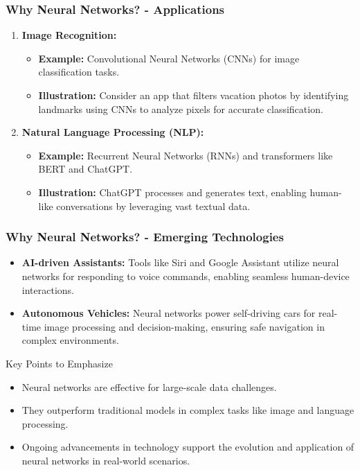 \documentclass[aspectratio=169]{beamer}
\begin{document}
\begin{frame}[fragile]
    \frametitle{Why Neural Networks? - Applications}
    \begin{enumerate}
        \item \textbf{Image Recognition:}
        \begin{itemize}
            \item \textbf{Example:} Convolutional Neural Networks (CNNs) for image classification tasks.
            \item \textbf{Illustration:} 
            Consider an app that filters vacation photos by identifying landmarks using CNNs to analyze pixels for accurate classification.
        \end{itemize}

        \item \textbf{Natural Language Processing (NLP):}
        \begin{itemize}
            \item \textbf{Example:} Recurrent Neural Networks (RNNs) and transformers like BERT and ChatGPT.
            \item \textbf{Illustration:} 
            ChatGPT processes and generates text, enabling human-like conversations by leveraging vast textual data.
        \end{itemize}
    \end{enumerate}
\end{frame}

\begin{frame}[fragile]
    \frametitle{Why Neural Networks? - Emerging Technologies}
    \begin{itemize}
        \item \textbf{AI-driven Assistants:} 
        Tools like Siri and Google Assistant utilize neural networks for responding to voice commands, enabling seamless human-device interactions.
        
        \item \textbf{Autonomous Vehicles:} 
        Neural networks power self-driving cars for real-time image processing and decision-making, ensuring safe navigation in complex environments.
    \end{itemize}

    \begin{block}{Key Points to Emphasize}
        \begin{itemize}
            \item Neural networks are effective for large-scale data challenges.
            \item They outperform traditional models in complex tasks like image and language processing.
            \item Ongoing advancements in technology support the evolution and application of neural networks in real-world scenarios.
        \end{itemize}
    \end{block}
\end{frame}
\end{document}

